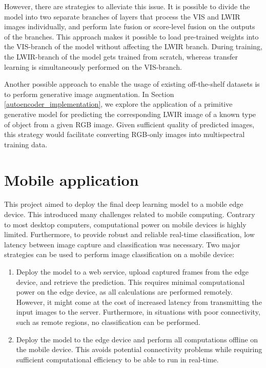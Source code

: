 \documentclass{l4proj}
\begin{document}
However, there are strategies to alleviate this issue. It is possible to divide the model into two separate branches of layers that process the VIS and LWIR images individually, and perform late fusion \citep{wagner_multispectral_2016} or score-level fusion \citep{guo_face_2017} on the outputs of the branches. This approach makes it possible to load pre-trained weights into the VIS-branch of the model without affecting the LWIR branch. During training, the LWIR-branch of the model gets trained from scratch, whereas transfer learning is simultaneously performed on the VIS-branch.

Another possible approach to enable the usage of existing off-the-shelf datasets is to perform generative image augmentation. In Section \ref{autoencoder_implementation}, we explore the application of a primitive generative model for predicting the corresponding LWIR image of a known type of object from a given RGB image. Given sufficient quality of predicted images, this strategy would facilitate converting RGB-only images into multispectral training data.


\section{Mobile application}
\label{analysis_mobile_application}

This project aimed to deploy the final deep learning model to a mobile edge device. This introduced many challenges related to mobile computing. Contrary to most desktop computers, computational power on mobile devices is highly limited. Furthermore, to provide robust and reliable real-time classification, low latency between image capture and classification was necessary. Two major strategies can be used to perform image classification on a mobile device:

\begin{enumerate}
  \item Deploy the model to a web service, upload captured frames from the edge device, and retrieve the prediction. This requires minimal computational power on the edge device, as all calculations are performed remotely. However, it might come at the cost of increased latency from transmitting the input images to the server. Furthermore, in situations with poor connectivity, such as remote regions, no classification can be performed.
  \item Deploy the model to the edge device and perform all computations offline on the mobile device. This avoids potential connectivity problems while requiring sufficient computational efficiency to be able to run in real-time.
\end{enumerate}
\end{document}
